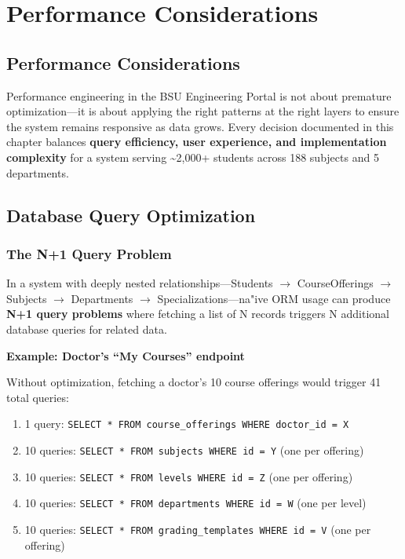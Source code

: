 
\chapter{Performance Considerations}
\label{chap:performance}
\newpage
\section*{Performance Considerations}


Performance engineering in the BSU Engineering Portal is not about premature optimization---it is about applying the right patterns at the right layers to ensure the system remains responsive as data grows. Every decision documented in this chapter balances \textbf{query efficiency, user experience, and implementation complexity} for a system serving \textasciitilde2,000+ students across 188 subjects and 5 departments.

\section{Database Query Optimization}
\label{sec:db-optimization}

\subsection{The N+1 Query Problem}

In a system with deeply nested relationships---Students $\rightarrow$ CourseOfferings $\rightarrow$ Subjects $\rightarrow$ Departments $\rightarrow$ Specializations---na"{i}ve ORM usage can produce \textbf{N+1 query problems} where fetching a list of N records triggers N additional database queries for related data.

\textbf{Example: Doctor's ``My Courses'' endpoint}

Without optimization, fetching a doctor's 10 course offerings would trigger 41 total queries:
\begin{enumerate}
    \item 1 query: \texttt{SELECT * FROM course\_offerings WHERE doctor\_id = X}
    \item 10 queries: \texttt{SELECT * FROM subjects WHERE id = Y} (one per offering)
    \item 10 queries: \texttt{SELECT * FROM levels WHERE id = Z} (one per offering)
    \item 10 queries: \texttt{SELECT * FROM departments WHERE id = W} (one per level)
    \item 10 queries: \texttt{SELECT * FROM grading\_templates WHERE id = V} (one per offering)
\end{enumerate}

